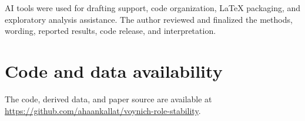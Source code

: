 \documentclass[11pt]{article}
\begin{document}
AI tools were used for drafting support, code organization, LaTeX packaging, and exploratory analysis assistance. The author reviewed and finalized the methods, wording, reported results, code release, and interpretation.

\section*{Code and data availability}

The code, derived data, and paper source are available at \url{https://github.com/ahaankallat/voynich-role-stability}.

\clearpage

\end{document}
